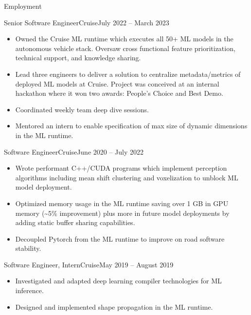 \documentclass[termes]{resume}
\begin{document}
	\begin{cvsection}{Employment}
		\begin{cvsubsection}{Senior Software Engineer}{Cruise}{July 2022 -- March 2023}		
			\begin{itemize}
				\item Owned the Cruise ML runtime which executes all 50+ ML models in the autonomous vehicle stack. Oversaw cross functional feature prioritization, technical support, and knowledge sharing.
				\item Lead three engineers to deliver a solution to centralize metadata/metrics of deployed ML models at Cruise. Project was conceived at an internal hackathon where it won two awards: People's Choice and Best Demo.
				\item Coordinated weekly team deep dive sessions.
				\item Mentored an intern to enable specification of max size of dynamic dimensions in the ML runtime.
			\end{itemize}
		\end{cvsubsection}
		
		\begin{cvsubsection}{Software Engineer}{Cruise}{June 2020 -- July 2022}		
			\begin{itemize}
				\item Wrote performant C++/CUDA programs which implement perception algorithms including mean shift clustering and voxelization to unblock ML model deployment.
				\item Optimized memory usage in the ML runtime saving over 1 GB in GPU memory (\sim5\% improvement) plus more in future model deployments by adding static buffer sharing capabilities.
 				\item Decoupled Pytorch from the ML runtime to improve on road software stability.
			\end{itemize}
		\end{cvsubsection}
		
		\begin{cvsubsection}{Software Engineer, Intern}{Cruise}{May 2019 -- August 2019}	
			\begin{itemize}
				\item Investigated and adapted deep learning compiler technologies for ML inference.
				\item Designed and implemented shape propagation in the ML runtime.
			\end{itemize}
		\end{cvsubsection}
		

\end{cvsection}
\end{document}

